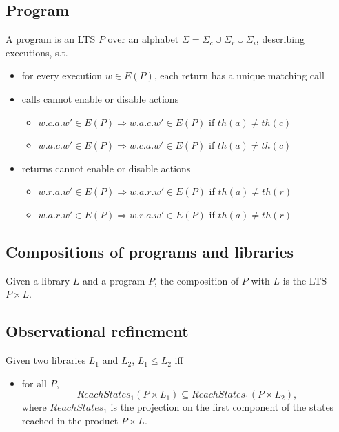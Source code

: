 \subsection{Program}



A program is an LTS $P$ over an alphabet $\Sigma=\Sigma_c\cup \Sigma_r\cup \Sigma_i$, describing executions, s.t.
\begin{itemize}
	\item for every execution $w \in E(P)$, each return has a unique matching call
	\item calls cannot enable or disable actions %
	\begin{itemize}
		\item $w.c.a.w'\in E(P)\Rightarrow w.a.c.w'\in E(P)$ if $th(a) \neq th(c)$
		\item $w.a.c.w' \in E(P) \Rightarrow w.c.a.w'\in E(P)$ if $th(a) \neq th(c)$
    	\end{itemize}
	\item returns cannot enable or disable actions 
	\begin{itemize}
		\item $w.r.a.w'\in E(P)\Rightarrow w.a.r.w'\in E(P)$ if $th(a) \neq th(r)$
		\item $w.a.r.w'\in E(P) \Rightarrow w.r.a.w' \in E(P)$ if $th(a) \neq th(r)$
	\end{itemize}
\end{itemize}

\subsection{Compositions of programs and libraries}

Given a library $L$ and a program $P$, the composition of $P$ with $L$ is the LTS $P\times L$.

\subsection{Observational refinement}

Given two libraries $L_1$ and $L_2$, $L_1\leq L_2$ iff
\begin{itemize}
	\item for all $P$, 
	\[
	ReachStates_1(P\times L_1) \subseteq ReachStates_1(P\times L_2),
	\] 
	where $ReachStates_1$ is the projection on the first component of the states reached in the product $P\times L$.
\end{itemize}

